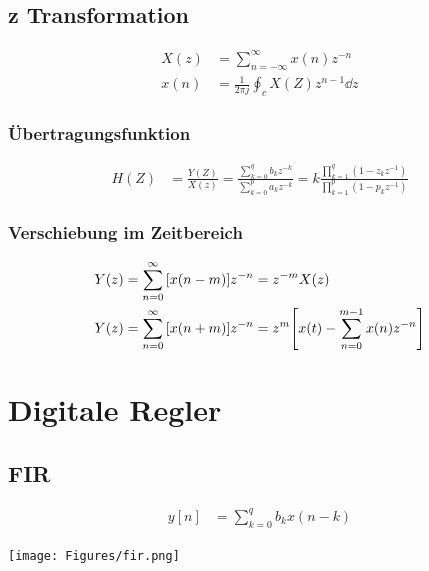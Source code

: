 \documentclass[10pt,a4paper]{article}
\begin{document}
  \subsection{z Transformation}
  \begin{mdframed}[style=exercise]
    \begin{align}
      X(z) &= \sum_{n=-\infty}^{\infty} x(n) z^{-n}\\
      x(n) &= \frac{1}{2\pi j} \oint_c X(Z) z^{n-1}\dd{z}
    \end{align}
  \end{mdframed}
  \subsubsection{Übertragungsfunktion}
  \begin{mdframed}[style=exercise]
    \begin{align}
      H(Z) &=\frac{Y(Z)}{X(z)}=\frac{\sum_{k=0}^q b_k z^{-k}}{\sum_{k=0}^p a_k z^{-k}}=k\frac{\prod_{k=1}^q (1-z_k z^{-1})}{\prod_{k=1}^p (1-p_k z^{-1})}
    \end{align}
  \end{mdframed}
  \subsubsection{Verschiebung im Zeitbereich}
  \begin{mdframed}[style=exercise]
    \begin{align}
      Y(z) &= \sum_{n=0}^{\infty} \qty[x(n-m)] z^{-n} =  z^{-m} X(z)\\
      Y(z) &= \sum_{n=0}^{\infty}\qty[x(n+m)]z^{-n} = z^{m}\qty[x(t)-\sum_{n=0}^{m-1} x(n) z^{-n}]
    \end{align}
  \end{mdframed}
  \section{Digitale Regler}
  \subsection{FIR}
  \begin{mdframed}[style=exercise]
    \begin{align}
      y[n] &= \sum_{k=0}^{q} b_k x(n-k)
    \end{align}
  \end{mdframed}
  \begin{center}
    \texttt{[image: Figures/fir.png]}
  \end{center}
\end{document}
